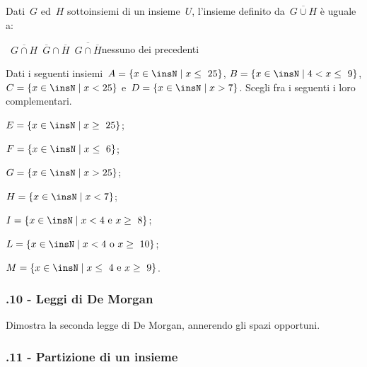 \begin{esercizio}
 \label{ese:\thechapter.65}
Dati~$G$ ed~$H$ sottoinsiemi di un insieme~$U$, l'insieme
definito da~$\overline{G\cup H}$ è uguale a:
\begin{center}
\boxA\quad~$\overline{G\cap H}$\quad\boxB\quad~$\overline{G}\cap\overline{H}$\quad\boxC\quad~$\overline{G\cap \overline{H}}$\quad\boxD\quad nessuno dei precedenti
\end{center}
\end{esercizio}
\pagebreak
\begin{esercizio}
\label{ese:\thechapter.66}
Dati i seguenti insiemi~$A=\{x\in\insN\mid x\le~25\}$, $B=\{x\in\insN\mid 4<x\le~9\}$, $C=\{x\in\insN\mid x<25\}$ e~$D=\{x\in\insN\mid x>7\}$.
Scegli fra i seguenti i loro complementari.
\begin{multicols}{2}
\begin{enumeratea}
\item $E=\{x\in\insN\mid x\ge~25\}$;
\item $F=\{x\in\insN\mid x\le~6\}$;
\item $G=\{x\in\insN\mid x>25\}$;
\item $H=\{x\in\insN\mid x<7\}$;
\item $I=\{x\in\insN\mid x<4\text{ e }x\ge~8\}$;
\item $L=\{x\in\insN\mid x<4\text{ o }x\ge~10\}$;
\item $M=\{x\in\insN\mid x\le~4\text{ e }x\ge~9\}$.
\end{enumeratea}
\end{multicols}
\end{esercizio}

\subsubsection*{\thechapter.10 - Leggi di De Morgan}

\begin{esercizio}
 \label{ese:\thechapter.67}
 Dimostra la seconda legge di De Morgan, annerendo gli spazi opportuni.
 \begin{center}
 
 \end{center}
\end{esercizio}

\subsubsection*{\thechapter.11 - Partizione di un insieme}

